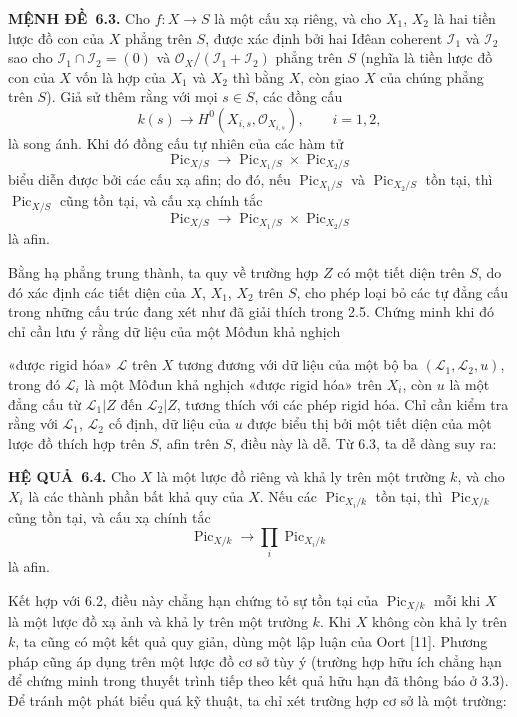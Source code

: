 \documentclass[11pt,twoside,openany]{book}
\numberwithin{equation}{section}
\newcommand{\src}[1]{%
  \phantomsection\hypertarget{src:\fgasourceid:#1}{}%
  \marginpar{\raggedleft\footnotesize\sffamily #1}%
}
\newcommand{\fgasourceid}{unset}
\newcommand{\result}[2]{\par\medskip\noindent\textbf{#1\if\relax\detokenize{#2}\relax\else\ #2\fi.}\quad}
\begin{document}
\result{MỆNH ĐỀ}{6.3} Cho $f:X\longrightarrow S$ là một cấu xạ riêng, và cho
$X_1$, $X_2$ là hai tiền lược đồ con của $X$ phẳng trên $S$, được xác định bởi
hai Iđêan coherent $\mathcal I_1$ và $\mathcal I_2$ sao cho
$\mathcal I_1\cap\mathcal I_2=(0)$ và
$\mathcal O_X/(\mathcal I_1+\mathcal I_2)$ phẳng trên $S$ (nghĩa là tiền lược
đồ con của $X$ vốn là hợp của $X_1$ và $X_2$ thì bằng $X$, còn giao $X$ của chúng
phẳng trên $S$). Giả sử thêm rằng với mọi $s\in S$,
các đồng cấu
\[
k(s)\longrightarrow H^0(X_{i,s},\mathcal O_{X_{i,s}}),\qquad i=1,2,
\]
là song ánh. Khi đó đồng cấu tự nhiên của các hàm tử
\[
\operatorname{Pic}_{X/S}\longrightarrow
\operatorname{Pic}_{X_1/S}\times\operatorname{Pic}_{X_2/S}
\]
biểu diễn được bởi các cấu xạ afin; do đó, nếu
$\operatorname{Pic}_{X_1/S}$ và $\operatorname{Pic}_{X_2/S}$ tồn tại, thì
$\operatorname{Pic}_{X/S}$ cũng tồn tại, và cấu xạ chính tắc
\[
\operatorname{Pic}_{X/S}\longrightarrow
\operatorname{Pic}_{X_1/S}\times\operatorname{Pic}_{X_2/S}
\]
là afin.

Bằng hạ phẳng trung thành, ta quy về trường hợp $Z$ có một tiết diện trên $S$,
do đó xác định các tiết diện của $X$, $X_1$, $X_2$ trên $S$, cho phép loại bỏ
các tự đẳng cấu trong những cấu trúc đang xét như đã giải thích trong 2.5.
Chứng minh khi đó chỉ cần lưu ý rằng dữ liệu của một Môđun khả nghịch
\src{159}
«được rigid hóa» $\mathcal L$ trên $X$ tương đương với dữ liệu của một bộ ba
$(\mathcal L_1,\mathcal L_2,u)$, trong đó $\mathcal L_i$ là một Môđun khả
nghịch «được rigid hóa» trên $X_i$, còn $u$ là một đẳng cấu từ
$\mathcal L_1|Z$ đến $\mathcal L_2|Z$, tương thích với các phép rigid hóa. Chỉ
cần kiểm tra rằng với $\mathcal L_1$, $\mathcal L_2$ cố định, dữ liệu của $u$
được biểu thị bởi một tiết diện của một lược đồ thích hợp trên $S$, afin trên
$S$, điều này là dễ. Từ 6.3, ta dễ dàng suy ra:

\result{HỆ QUẢ}{6.4} Cho $X$ là một lược đồ riêng và khả ly trên một trường
$k$, và cho $X_i$ là các thành phần bất khả quy của $X$. Nếu các
$\operatorname{Pic}_{X_i/k}$ tồn tại, thì $\operatorname{Pic}_{X/k}$ cũng tồn
tại, và cấu xạ chính tắc
\[
\operatorname{Pic}_{X/k}\longrightarrow\prod_i\operatorname{Pic}_{X_i/k}
\]
là afin.

Kết hợp với 6.2, điều này chẳng hạn chứng tỏ sự tồn tại của
$\operatorname{Pic}_{X/k}$ mỗi khi $X$ là một lược đồ xạ ảnh và khả ly trên
một trường $k$. Khi $X$ không còn khả ly trên $k$, ta cũng có một kết quả quy
giản, dùng một lập luận của Oort [11]. Phương pháp cũng áp dụng trên một lược đồ
cơ sở tùy ý (trường hợp hữu ích chẳng hạn để chứng minh trong thuyết trình tiếp
theo kết quả hữu hạn đã thông báo ở 3.3). Để tránh một phát biểu quá kỹ thuật,
ta chỉ xét trường hợp cơ sở là một trường:
\end{document}
